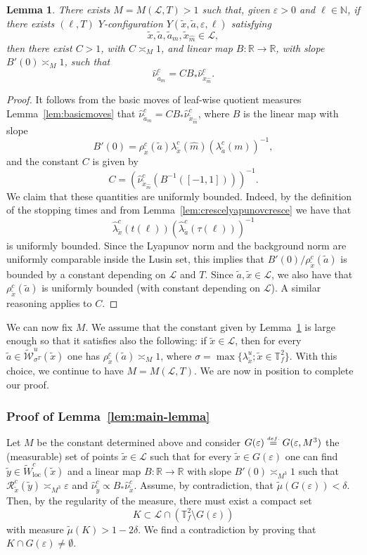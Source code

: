 \documentclass[a4paper,11pt,reqno]{amsart}
\def\tW{\widetilde W}
\newcommand{\R}{{\mathbb R}}
\newcommand{\N}{{\mathbb N}}
\newcommand{\TTf}{{\mathbb{T}_f^2}}
\newcommand{\loc}{{\operatorname{loc}}}
\newcommand{\cL}{{\mathcal L}}
\newcommand{\cW}{{\mathcal W}}
\newcommand{\cR}{{\mathcal R}}
\newcommand{\eps}{\varepsilon}
\newcommand{\eqdef}{\stackrel{\scriptscriptstyle\textrm def.}{=}}
\newcommand{\tix}{\tilde{x}}
\newcommand{\ta}{\tilde{a}}
\newcommand{\tm}{\tilde{\mu}}
\newcommand{\w}{\widetilde{\cW}}
\newtheorem{lemma}[theorem]{Lemma}
\theoremstyle{definition}
\begin{document}
\begin{lemma}
    \label{lem:lemadom}
There exists $M=M(\cL,T)>1$ such that, given $\eps>0$ and $\ell\in\N$, if there exists $(\ell,T)$ $Y$-configuration $Y(\tix,\ta,\eps,\ell)$ satisfying 
\[
\tix,\ta,\ta_m,\tix_{\hat{m}}\in\cL,
\]
then there exist $C>1$, with $C\asymp_M1$, and linear map $B:\R\to\R$, with slope $B'(0)\asymp_M1$, such that 
\[
\hat{\nu}^c_{\ta_m}=CB_*\hat{\nu}^c_{\tix_{\hat{m}}}.
\]
\end{lemma}
\begin{proof}
It follows from the basic moves of leaf-wise quotient measures Lemma~\ref{lem:basicmoves} that $\hat{\nu}^c_{\ta_m}=CB_*\hat{\nu}^c_{\tix_{\hat{m}}}$, where $B$ is the linear map with slope
\[
B'(0)=\rho^c_{\tix}(\ta)\lambda^c_{\tix}(\hat{m})\left(\lambda^c_{\ta}(m)\right)^{-1},
\]
and the constant $C$ is given by
\[
C=\left(\hat{\nu}^c_{\tix_{\hat{m}}}(B^{-1}([-1,1]))\right)^{-1}.
\]
We claim that these quantities are uniformly bounded. Indeed, by the definition of the stopping times and from Lemma~\ref{lem:crescelyapunovcresce} we have that 
\[
\hat{\lambda}^c_{\tix}(t(\ell))\left(\hat{\lambda}^c_{\ta}(\tau(\ell))\right)^{-1}
\]
is uniformly bounded. Since the Lyapunov norm and the background norm are uniformly comparable inside the Lusin set, this implies that $B'(0)/\rho^c_{\tix}(\ta)$ is bounded by a constant depending on $\cL$ and $T$. Since $\ta,\tix\in\cL$, we also have that $\rho^c_{\tix}(\ta)$ is uniformly bounded (with constant depending on $\cL$). A similar reasoning applies to $C$.
\end{proof}

We can now fix $M$. We assume that the constant given by Lemma~\ref{lem:lemadom} is large enough so that it satisfies also the following: if $\tix\in\cL$, then for every $\tilde{a}\in\w^u_{\sigma^T}(\tix)$ one has $\rho^c_{\tix}(\ta)\asymp_M1$, where $\sigma=\max\{\lambda^u_{\tix};\tix\in\TTf\}$. With this choice, we continue to have $M=M(\cL,T)$. We are now in position to complete our proof.

\subsubsection{Proof of Lemma~\ref{lem:main-lemma}}
Let $M$ be the constant determined above and consider $G(\eps)\eqdef G(\eps,M^{3})$ the (measurable) set of points $\tix\in\cL$ such that for every $\tix\in G(\eps)$ one can find $\tilde{y}\in \tW^c_{\loc}(\tix)$ and a linear map $B:\R\to\R$ with slope $B'(0)\asymp_{M^3}1$ such that $\cR^c_{\tix}(\tilde{y})\asymp_{M^3}\eps$ and $\hat{\nu}^c_{\tilde{y}}\propto B_*\hat{\nu}^c_{\tix}$. Assume, by contradiction, that $\tm(G(\eps))<\delta$. Then, by the regularity of the measure, there must exist a compact set 
\[
K\subset\cL\cap\left(\TTf\setminus G(\eps)\right)
\] 
with measure $\tm(K)>1-2\delta.$ We find a contradiction by proving that $K\cap G(\eps)\neq\emptyset$.
\end{document}
